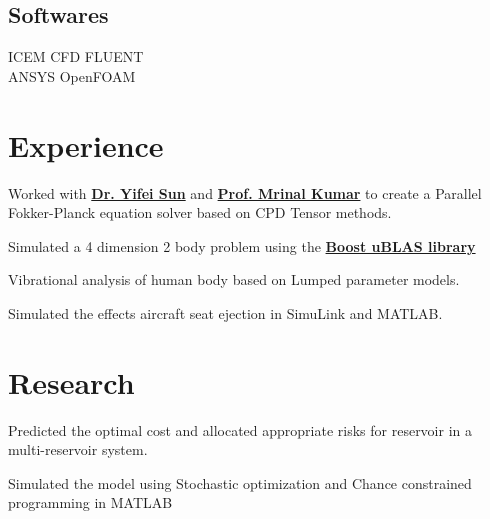 \documentclass[]{resume}
\begin{document}
\begin{minipage}[t]{0.33\textwidth}
\subsection{Softwares}
ICEM CFD \textbullet{} FLUENT \textbullet{} \\
ANSYS \textbullet{} OpenFOAM \\
\sectionsep

%
%

\end{minipage}
\hfill
\begin{minipage}[t]{0.66\textwidth}


\section{Experience}
\vspace{\topsep} %
\begin{tightemize}
\item Worked with \textbf{\href{http://plaza.ufl.edu/yfsun/index.html}{Dr. Yifei Sun}} and
	\textbf{\href{http://web.mae.ufl.edu/~mrinalkumar/index.html}{Prof. Mrinal Kumar}} to create a Parallel
	Fokker-Planck equation solver based on CPD Tensor methods.
\item Simulated a 4 dimension 2 body problem using the
	\textbf{\href{http://www.boost.org/doc/libs/1_58_0/libs/numeric/ublas/doc}{Boost uBLAS library}}
\end{tightemize}
\sectionsep

\begin{tightemize}
\item Vibrational analysis of human body based on Lumped parameter models.
\item Simulated the effects aircraft seat ejection in SimuLink and MATLAB.
\end{tightemize}
\sectionsep


\section{Research}
\begin{tightemize}
\item Predicted the optimal cost and allocated appropriate risks for reservoir in a multi-reservoir system.
\item Simulated the model using Stochastic optimization and Chance constrained programming in MATLAB
\end{tightemize}
\sectionsep


\end{minipage}
\end{document}
